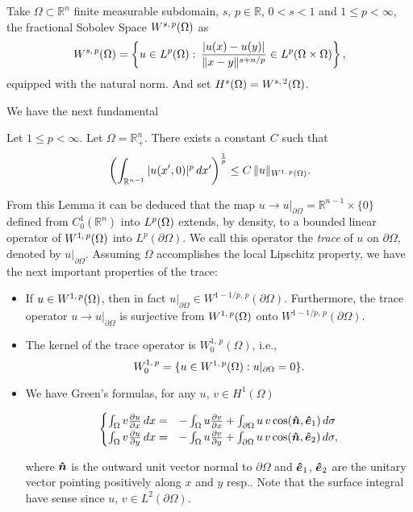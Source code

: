 \begin{definition} Take $\Omega\subset \mathbb{R}^n$ finite measurable subdomain, $s,\,p\in \mathbb{R}$, $0<s<1$ and $1\leq p <\infty$, the fractional Sobolev Space ${W^{s,\,p}(\Omega)}$ as
$${W^{s,\,p}(\Omega)}=\left\{u\in {L^{p}(\Omega)}:\,\frac{|u(x)-u(y)|}{\|x-y\|^{s+n/p}} \in L^p(\Omega \times \Omega)\right\},$$
equipped with the natural norm. And set $H^{s}(\Omega)={W^{s,\,2}(\Omega)}$.
\end{definition}

We have the next fundamental
\begin{lemma}
 Let $1\leq p < \infty$. Let $\Omega = \mathbb{R}^n_+$. There exists a constant $C$ such that
 $$\left(\int_{\mathbb{R}^{n-1}}|u(x',0)|^p\,dx'\right)^\frac{1}{p}\leq C\, \|u\|_{W^{1,\,p}(\Omega)}.$$
 \end{lemma}
 From this Lemma it can be deduced that the map $u\rightarrow u|_{\partial \Omega}=\mathbb{R}^{n-1}\times \{0\}$ defined from $C_0^1\left(\mathbb{R}^n\right)$ into ${L^{p}(\Omega)}$ extends, by density, to a bounded linear operator of ${W^{1,\,p}(\Omega)}$ into $L^p(\partial \Omega)$. We call this operator the \emph{trace} of $u$ on $\partial \Omega$, denoted by $u|_{\partial \Omega}$. Assuming $\Omega$ accomplishes the local Lipschitz property, we have the next important properties of the trace:
 \begin{itemize}
 \item If $u\in {W^{1,\,p}(\Omega)}$, then in fact $u|_{\partial \Omega}\in W^{1-1/p,\,p}(\partial \Omega)$. Furthermore, the trace operator $u\rightarrow u|_{\partial \Omega}$ is surjective from ${W^{1,\,p}(\Omega)}$ onto $W^{1-1/p,\,p}(\partial\Omega)$.
 \item The kernel of the trace operator is $W_0^{1,\,p}(\Omega)$, i.e.,
 $$W^{1,\,p}_0=\{u\in {W^{1,\,p}(\Omega)}: u|_{\partial \Omega}=0\}.$$
 \item We have Green's formulas, for any $u$,  $v\in H^1(\Omega)$
 
 \begin{equation}
 \begin{cases}
 \int_\Omega v\parder{u}{x}\,dx = & - \int_\Omega u\parder{v}{x}+\int_{\partial \Omega}u\,v \cos(\bds{\hat{n}},\bds{\hat{e}}_1)\,d\sigma \\
 \int_\Omega v\parder{u}{y}\,dx = &- \int_\Omega u\parder{v}{y}+\int_{\partial \Omega}u\,v \cos(\bds{\hat{n}},\bds{\hat{e}}_2)\,d\sigma,
 \end{cases}\label{eq:greens_formula}
 \end{equation}

where $\boldsymbol{\hat{n}}$ is the outward unit vector normal to $\partial \Omega$ and $\boldsymbol{\hat{e}}_1$, $\boldsymbol{\hat{e}}_2$ are the unitary vector pointing positively along $x$ and $y$ resp.. Note that the surface integral have sense since $u$, $v\in L^2(\partial \Omega)$.
 \end{itemize}
 
